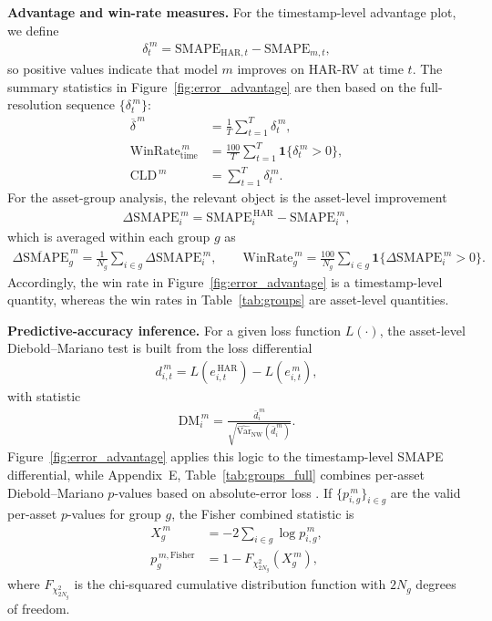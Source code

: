 \documentclass[11pt,a4paper]{article}
\begin{document}
\vspace{0.15cm}
\noindent \textbf{Advantage and win-rate measures.}
For the timestamp-level advantage plot, we define
\begin{align*}
\delta_t^{\,m}
=
\mathrm{SMAPE}_{\mathrm{HAR},t}
-
\mathrm{SMAPE}_{m,t},
\end{align*}
so positive values indicate that model $m$ improves on HAR-RV at time $t$. The summary statistics in Figure~\ref{fig:error_advantage} are then based on the full-resolution sequence $\{\delta_t^{\,m}\}$:
\begin{align*}
\overline{\delta}^{\,m} &= \frac{1}{T}\sum_{t=1}^{T}\delta_t^{\,m},\\
\mathrm{WinRate}^{\,m}_{\mathrm{time}} &= \frac{100}{T}\sum_{t=1}^{T}\mathbf{1}\{\delta_t^{\,m}>0\},\\
\mathrm{CLD}^{\,m} &= \sum_{t=1}^{T}\delta_t^{\,m}.
\end{align*}
For the asset-group analysis, the relevant object is the asset-level improvement
\begin{align*}
\Delta \mathrm{SMAPE}_i^{\,m}
=
\mathrm{SMAPE}^{\,\mathrm{HAR}}_i
-
\mathrm{SMAPE}^{\,m}_i,
\end{align*}
which is averaged within each group $g$ as
\begin{align*}
\overline{\Delta \mathrm{SMAPE}}^{\,m}_g
=
\frac{1}{N_g}\sum_{i \in g}\Delta \mathrm{SMAPE}_i^{\,m},
\qquad
\mathrm{WinRate}^{\,m}_g
=
\frac{100}{N_g}\sum_{i \in g}\mathbf{1}\{\Delta \mathrm{SMAPE}_i^{\,m}>0\}.
\end{align*}
Accordingly, the win rate in Figure~\ref{fig:error_advantage} is a timestamp-level quantity, whereas the win rates in Table~\ref{tab:groups} are asset-level quantities.

\vspace{0.15cm}
\noindent \textbf{Predictive-accuracy inference.}
For a given loss function $L(\cdot)$, the asset-level Diebold--Mariano test is built from the loss differential
\begin{align*}
d^{\,m}_{i,t}
=
L\!\left(e^{\,\mathrm{HAR}}_{i,t}\right)
-
L\!\left(e^{\,m}_{i,t}\right),
\end{align*}
with statistic
\begin{align*}
\mathrm{DM}^{\,m}_i
=
\frac{\bar{d}^{\,m}_i}{\sqrt{\widehat{\mathrm{Var}}_{\mathrm{NW}}(\bar{d}^{\,m}_i)}}.
\end{align*}
Figure~\ref{fig:error_advantage} applies this logic to the timestamp-level SMAPE differential, while Appendix~E, Table~\ref{tab:groups_full} combines per-asset Diebold--Mariano $p$-values based on absolute-error loss \cite{diebold1995}. If $\{p^{\,m}_{i,g}\}_{i \in g}$ are the valid per-asset $p$-values for group $g$, the Fisher combined statistic is
\begin{align*}
X^{\,m}_g &= -2\sum_{i \in g}\log p^{\,m}_{i,g},\\
p^{\,m,\mathrm{Fisher}}_g &= 1 - F_{\chi^2_{2N_g}}\!\left(X^{\,m}_g\right),
\end{align*}
where $F_{\chi^2_{2N_g}}$ is the chi-squared cumulative distribution function with $2N_g$ degrees of freedom.
\end{document}
